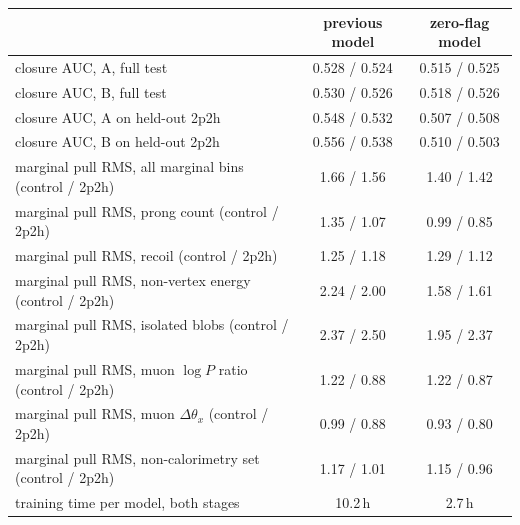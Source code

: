 \begin{tabular}{lcc}
\toprule
 & previous model & zero-flag model \\
\midrule
closure AUC, A, full test & 0.528 / 0.524 & 0.515 / 0.525 \\
closure AUC, B, full test & 0.530 / 0.526 & 0.518 / 0.526 \\
closure AUC, A on held-out 2p2h & 0.548 / 0.532 & 0.507 / 0.508 \\
closure AUC, B on held-out 2p2h & 0.556 / 0.538 & 0.510 / 0.503 \\
\midrule
marginal pull RMS, all marginal bins (control / 2p2h) & 1.66 / 1.56 & 1.40 / 1.42 \\
marginal pull RMS, prong count (control / 2p2h) & 1.35 / 1.07 & 0.99 / 0.85 \\
marginal pull RMS, recoil (control / 2p2h) & 1.25 / 1.18 & 1.29 / 1.12 \\
marginal pull RMS, non-vertex energy (control / 2p2h) & 2.24 / 2.00 & 1.58 / 1.61 \\
marginal pull RMS, isolated blobs (control / 2p2h) & 2.37 / 2.50 & 1.95 / 2.37 \\
marginal pull RMS, muon $\log P$ ratio (control / 2p2h) & 1.22 / 0.88 & 1.22 / 0.87 \\
marginal pull RMS, muon $\Delta\theta_x$ (control / 2p2h) & 0.99 / 0.88 & 0.93 / 0.80 \\
marginal pull RMS, non-calorimetry set (control / 2p2h) & 1.17 / 1.01 & 1.15 / 0.96 \\
\midrule
training time per model, both stages & 10.2\,h & 2.7\,h \\
\bottomrule
\end{tabular}
